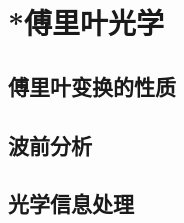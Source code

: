 

\section{*傅里叶光学}\label{26-3}

\subsection{傅里叶变换的性质}\label{26-3-1}

\subsection{波前分析}\label{26-3-2}

\subsection{光学信息处理}\label{26-3-3}